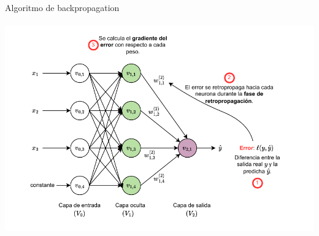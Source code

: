 \documentclass{beamer}
\begin{document}




\begin{frame}{Algoritmo de backpropagation}
\framesubtitle{\insertsubsectionhead}
\centering 
\includegraphics[width=1.1\textwidth]{img/red_neuronal-backpropagation.drawio.pdf}
\end{frame}
\end{document}
